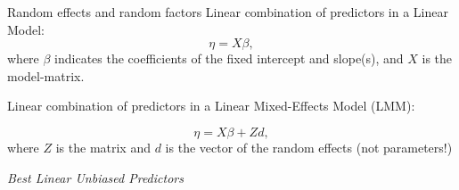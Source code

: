 \documentclass[aspectratio=149, xcolor=table]{beamer}
\begin{document}
%
%
%		
%	
%		
%
%	
%


\begin{frame}{Random effects and random factors}
	Linear combination of predictors in a Linear Model: 
	\begin{equation*}
		\eta = X \beta,
	\end{equation*}
	where $\beta$ indicates the coefficients of the fixed intercept and slope(s), and $X$ is the model-matrix.
	

	Linear combination of predictors in a Linear Mixed-Effects Model (LMM): 
	
	\begin{equation*}
		\eta = X \beta + Zd,
	\end{equation*}
	where $Z$ is the matrix and $d$ is the vector of the random effects (not parameters!)
	
	
	\vspace{2.5mm}
	\begin{center}
		\emph{Best Linear Unbiased Predictors}
	\end{center}
\end{frame}
\end{document}
